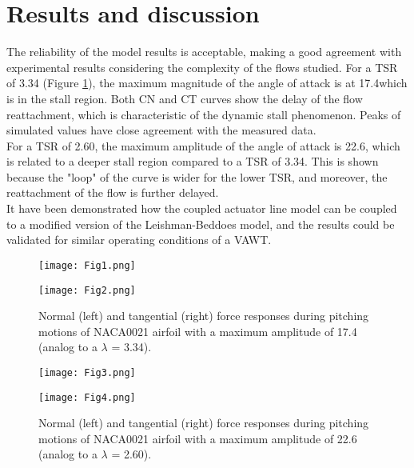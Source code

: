 \documentclass[a4paper]{jpconf}
\begin{document}
\section{Results and discussion}
The reliability of the model results is acceptable, making a good agreement with experimental results considering the complexity of the flows studied. For a TSR of 3.34 (Figure \ref{fig1}), the maximum magnitude of the angle of attack is at 17.4\degree which is in the stall region. Both CN and CT curves show the delay of the flow reattachment, which is characteristic of the dynamic stall phenomenon. Peaks of simulated values have close agreement with the measured data.\\
For a TSR of 2.60, the maximum amplitude of the angle of attack is 22.6, which is related to a deeper stall region compared to a TSR of 3.34. This is shown because the "loop" of the curve is wider for the lower TSR, and moreover, the reattachment of the flow is further delayed.\\
It have been demonstrated how the coupled actuator line model can be coupled to a modified version of the Leishman-Beddoes model, and the results could be validated for similar operating conditions of a VAWT.



\begin{figure}[h]
\begin{minipage}{18pc}
\texttt{[image: Fig1.png]}
\end{minipage}\hspace{2pc}%
\begin{minipage}{18pc}
\texttt{[image: Fig2.png]}
\end{minipage}
\caption{\label{fig1}Normal (left) and tangential (right) force responses during pitching motions of NACA0021 airfoil with a maximum amplitude of 17.4 \degree (analog to a $\lambda$ = 3.34).}
\end{figure}


\begin{figure}[h]
\begin{minipage}{18pc}
\texttt{[image: Fig3.png]}
\end{minipage}\hspace{2pc}%
\begin{minipage}{18pc}
\texttt{[image: Fig4.png]}
\end{minipage}
\caption{\label{fig2}Normal (left) and tangential (right) force responses during pitching motions of NACA0021 airfoil with a maximum amplitude of 22.6 \degree (analog to a $\lambda$ = 2.60).}
\end{figure}
\end{document}
